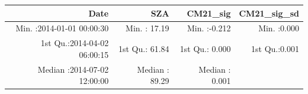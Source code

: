 \documentclass[
  10pt,
  a4paper,oneside]{article}
\begin{document}
\begin{longtable}[]{@{}rrrr@{}}
\toprule
\begin{minipage}[b]{0.33\columnwidth}\raggedleft
Date\strut
\end{minipage} & \begin{minipage}[b]{0.19\columnwidth}\raggedleft
SZA\strut
\end{minipage} & \begin{minipage}[b]{0.19\columnwidth}\raggedleft
CM21\_sig\strut
\end{minipage} & \begin{minipage}[b]{0.19\columnwidth}\raggedleft
CM21\_sig\_sd\strut
\end{minipage}\tabularnewline
\midrule
\endhead
\begin{minipage}[t]{0.33\columnwidth}\raggedleft
Min. :2014-01-01 00:00:30\strut
\end{minipage} & \begin{minipage}[t]{0.19\columnwidth}\raggedleft
Min. : 17.19\strut
\end{minipage} & \begin{minipage}[t]{0.19\columnwidth}\raggedleft
Min. :-0.212\strut
\end{minipage} & \begin{minipage}[t]{0.19\columnwidth}\raggedleft
Min. :0.000\strut
\end{minipage}\tabularnewline
\begin{minipage}[t]{0.33\columnwidth}\raggedleft
1st Qu.:2014-04-02 06:00:15\strut
\end{minipage} & \begin{minipage}[t]{0.19\columnwidth}\raggedleft
1st Qu.: 61.84\strut
\end{minipage} & \begin{minipage}[t]{0.19\columnwidth}\raggedleft
1st Qu.: 0.000\strut
\end{minipage} & \begin{minipage}[t]{0.19\columnwidth}\raggedleft
1st Qu.:0.001\strut
\end{minipage}\tabularnewline
\begin{minipage}[t]{0.33\columnwidth}\raggedleft
Median :2014-07-02 12:00:00\strut
\end{minipage} & \begin{minipage}[t]{0.19\columnwidth}\raggedleft
Median : 89.29\strut
\end{minipage} & \begin{minipage}[t]{0.19\columnwidth}\raggedleft
Median : 0.001\strut
\end{minipage} & \begin{minipage}[t]{0.19\columnwidth}\raggedleft

\end{minipage}
\end{longtable}
\end{document}
